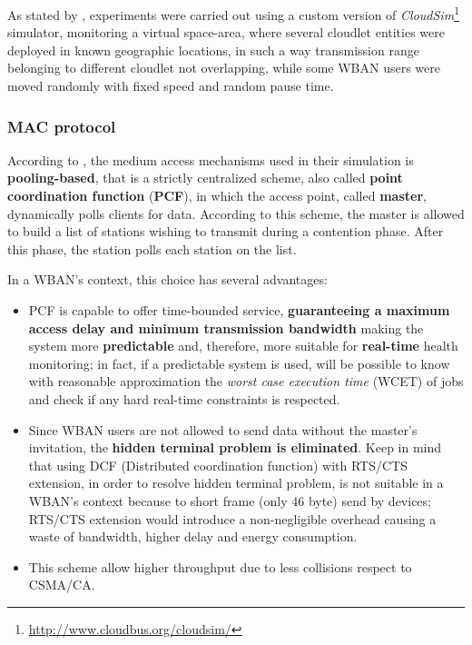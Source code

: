 \documentclass[sigchi]{acmart}
\begin{document}
\vspace{0.3cm}

As stated by \citet{MSAReport}, experiments were carried out using a custom version of \textit{CloudSim}\footnote{\url{http://www.cloudbus.org/cloudsim/}} simulator, monitoring a virtual space-area, where several cloudlet entities were deployed in known geographic locations, in such a way transmission range belonging to different cloudlet not overlapping, while some WBAN users were moved randomly with fixed speed and random pause time.

\subsubsection{MAC protocol}

According to \citet{MSAReport}, the medium access mechanisms used in their simulation is \textbf{pooling-based}, that is a strictly centralized scheme, also called \textbf{point coordination function} (\textbf{PCF}), in which the access point, called \textbf{master}, dynamically polls clients for data. According to this scheme, the master is allowed to build a list of stations wishing to transmit during a contention phase. After this phase, the station polls each station on the list.

In a WBAN's context, this choice has several advantages:

\begin{itemize}

\item PCF is capable to offer time-bounded service, \textbf{guaranteeing a maximum access delay and minimum transmission bandwidth} making the system more \textbf{predictable} and, therefore, more suitable for \textbf{real-time} health monitoring; in fact, if a predictable system is used, will be possible to know with reasonable approximation the \textit{worst case execution time} (WCET) of jobs and check if any hard real-time constraints is respected.

\item Since WBAN users are not allowed to send data without the master's invitation, the \textbf{hidden terminal problem is eliminated}. Keep in mind that using DCF (Distributed coordination function) with RTS/CTS extension, in order to resolve hidden terminal problem, is not suitable in a WBAN's context because to short frame (only 46 byte) send by devices; RTS/CTS extension would introduce a non-negligible overhead causing a waste of bandwidth, higher delay and energy consumption.\cite{schiller2003mobile}

\item This scheme allow higher throughput due to less collisions respect to CSMA/CA.\cite{schiller2003mobile}

\end{itemize}
\end{document}
